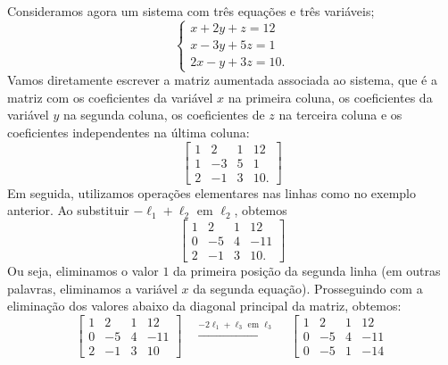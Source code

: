 \begin{ex}\label{exemplo3por3}
Consideramos agora um sistema com três equações e três variáveis;
\begin{equation}
\left\{
  \begin{array}{ll}
    x + 2y + z = 12 \\
    x -3y + 5z = 1 \\
    2x - y + 3z = 10.
  \end{array}
\right.
\end{equation} Vamos diretamente escrever a matriz aumentada associada ao sistema, que é a matriz com os coeficientes da variável $x$ na primeira coluna, os coeficientes da variável $y$ na segunda coluna, os coeficientes de $z$ na terceira coluna e os coeficientes independentes na última coluna:
\begin{equation}
\left[
  \begin{array}{ccc|c}
    1 &  2 & 1 & 12 \\
    1 & -3 & 5 & 1 \\
    2 & -1 & 3 & 10.
  \end{array}
\right]
\end{equation} Em seguida, utilizamos operações elementares nas linhas como no exemplo anterior. Ao substituir $-\ell_1 + \ell_2$ em $\ell_2$, obtemos
\begin{equation}
\left[
  \begin{array}{ccc|c}
    1 &  2 & 1 & 12 \\
    0 & -5 & 4 & -11 \\
    2 & -1 & 3 & 10 .
  \end{array}
\right]
\end{equation} Ou seja, eliminamos o valor $1$ da primeira posição da segunda linha (em outras palavras, eliminamos a variável $x$ da segunda equação). Prosseguindo com a eliminação dos valores abaixo da diagonal principal da matriz, obtemos:
\begin{equation}
\left[
  \begin{array}{ccc|c}
    1 &  2 & 1 & 12 \\
    0 & -5 & 4 & -11 \\
    2 & -1 & 3 & 10
  \end{array}
\right]
\quad \xrightarrow{-2\ell_1 + \ell_3 \text{ em } \ell_3} \quad
\left[
  \begin{array}{ccc|c}
    1 &  2 & 1 &  12 \\
    0 & -5 & 4 & -11 \\
    0 & -5 & 1 & -14
  \end{array}

\end{equation}
\end{ex}
